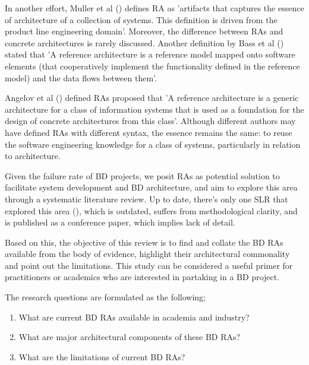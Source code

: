 \documentclass[review]{elsarticle}
\begin{document}
In another effort, Muller et al (\cite{muller2008reference}) defines RA as 'artifacts that captures the essence of architecture of a collection of systems. This definition is driven from the product line engineering domain'. Moreover, the difference between RAs and concrete architectures is rarely discussed. Another definition by Bass et al (\cite{Bass}) stated that 'A reference architecture is a reference model mapped onto software elements (that cooperatively implement the functionality defined in the reference model) and the data flows between them'. 

Angelov et al (\cite{angelov2009classification}) defined RAs proposed that 'A reference architecture is a generic architecture for a class of information systems that is used as a foundation for the design of concrete architectures from this class'. Although different authors may have defined RAs with different syntax, the essence remains the same: to reuse the software engineering knowledge for a class of systems, particularly in relation to architecture. 

Given the failure rate of BD projects, we posit RAs as potential solution to facilitate system development and BD architecture, and aim to explore this area through a systematic literature review. Up to date, there's only one SLR that explored this area (\cite{AtaeiACIS}), which is outdated, suffers from methodological clarity, and is published as a conference paper, which implies lack of detail.

Based on this, the objective of this review is to find and collate the BD RAs available from the body of evidence, highlight their architectural commonality and point out the limitations. This study can be considered a useful primer for practitioners or academics who are interested in partaking in a BD project. 

The research questions are formulated as the following; 
\begin{enumerate}
    \item What are current BD RAs available in academia and industry?
    \item What are major architectural components of these BD RAs? 
    \item What are the limitations of current BD RAs?
\end{enumerate}
\end{document}
